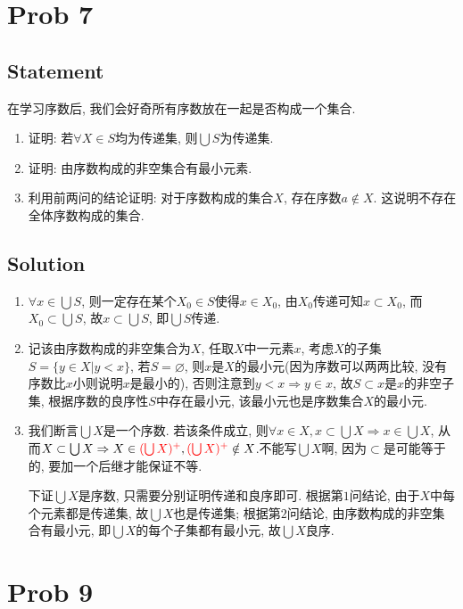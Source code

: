 \documentclass[UTF-8]{ctexart}
\begin{document}
\section{Prob 7}
\subsection{Statement}

在学习序数后, 我们会好奇所有序数放在一起是否构成一个集合.
\begin{enumerate}
	\item 证明: 若$\forall X \in S$均为传递集, 则$\bigcup S$为传递集.
	\item 证明: 由序数构成的非空集合有最小元素.
	\item 利用前两问的结论证明: 对于序数构成的集合$X$, 存在序数$a \notin X$. 这说明不存在全体序数构成的集合.
\end{enumerate}

\subsection{Solution}
\begin{enumerate}
	\item $\forall x \in \bigcup S$, 则一定存在某个$X_0 \in S$使得$x \in X_0$, 由$X_0$传递可知$x \subset X_0$, 而$X_0 \subset \bigcup S$, 故$x \subset \bigcup S$, 即$\bigcup S$传递.
	\item 记该由序数构成的非空集合为$X$, 任取$X$中一元素$x$, 考虑$X$的子集$S = \{y \in X | y < x\}$, 若$S = \varnothing$, 则$x$是$X$的最小元(因为序数可以两两比较, 没有序数比$x$小则说明$x$是最小的), 否则注意到$y < x \Rightarrow y \in x$, 故$S \subset x$是$x$的非空子集, 根据序数的良序性$S$中存在最小元, 该最小元也是序数集合$X$的最小元.
	\item 我们断言$\bigcup X$是一个序数. 若该条件成立, 则$\forall x \in X, x \subset \bigcup X \Rightarrow x \in \bigcup X$, 从而$X \subset \bigcup X \Rightarrow X \in {\color{red}(\bigcup X)^+}, {\color{red}(\bigcup X)^+} \notin X$.{\color{red}不能写$\bigcup X$啊, 因为$\subset$是可能等于的, 要加一个后继才能保证不等.}
	
	下证$\bigcup X$是序数, 只需要分别证明传递和良序即可. 根据第$1$问结论, 由于$X$中每个元素都是传递集, 故$\bigcup X$也是传递集; 根据第$2$问结论, 由序数构成的非空集合有最小元, 即$\bigcup X$的每个子集都有最小元, 故$\bigcup X$良序.
\end{enumerate}

\section{Prob 9}
\end{document}
